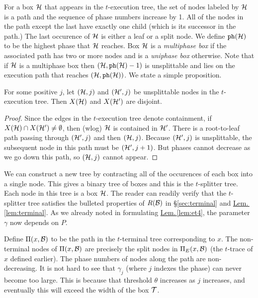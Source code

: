 \documentclass{acmsmall}
\newcommand{\cB}{{\cal B}}
\newcommand{\cH}{{\cal H}}
\newcommand{\cT}{{\cal T}}
\newcommand{\Sec}[1]{\hyperref[sec:#1]{\S\ref*{sec:#1}}} %
\newcommand{\Lem}[1]{\hyperref[lem:#1]{Lem.\,\ref*{lem:#1}}} %
\newcommand{\phase}{{\tt ph}}
\begin{document}
For a box $\cH$ that appears in the $t$-execution tree, the set of nodes labeled by $\cH$ is a path and the sequence of
phase numbers increase by 1.  All of the nodes in the path except the last have exactly one child (which is its successor
in the path.)  The last occurence of $\cH$ is either a leaf or a split node.  We define $\phase(\cH)$ to be the highest phase
that $\cH$ reaches.   Box $\cH$ is a {\em multiphase box} if the associated path has two or more nodes
and is a {\em uniphase box} otherwise.  Note that if $\cH$ is a multiphase box then $(\cH,\phase(\cH)-1)$ is
unsplittable and lies on the execution path that reaches $(\cH,\phase(\cH))$. We state a simple proposition.

\begin{proposition} \label{prop:phase-box} For some positive $j$, let $(\cH,j)$ and $(\cH',j)$ be unsplittable nodes in the $t$-execution tree.
Then $X(\cH)$ and $X(\cH')$ are disjoint.
\end{proposition}

\begin{proof} Since the edges in the $t$-execution tree denote containment, if $X(\cH) \cap X(\cH') \neq \emptyset$, then
(wlog) $\cH$ is contained in $\cH'$. There is a root-to-leaf path passing through $(\cH',j)$ and then $(\cH,j)$.
Because $(\cH',j)$ is unsplittable, the subsequent node in this path must be $(\cH',j+1)$. But phases
cannot decrease as we go down this path, so $(\cH,j)$ cannot appear.
\end{proof}

We can construct a new tree by contracting all of the occurences of each box into a single node.  This gives a binary
tree of boxes and this is the $t$-splitter tree.  Each node in this tree is a box $\cH$.
The reader can readily verify that the $t$-splitter tree satisfies the  bulleted properties of $R(\cB)$ in
\Sec{terminal} and \Lem{terminal}.  As we already noted in formulating \Lem{et4},
the parameter $\gamma$  now depends on $P$.



Define $\Pi(x,\cB)$ to be the path in the $t$-terminal tree corresponding to $x$.  The non-terminal nodes of $\Pi(x,\cB)$
are precisely the split nodes in $\Pi_E(x,\cB)$ (the $t$-trace of $x$ defined earlier).  
The phase numbers of nodes along the path are non-decreasing. 
It is not hard to see that $\gamma_j$ (where $j$ indexes the phase) can never become too large. This is because that threshold $\theta$
increases as $j$ increases, and eventually this will exceed the width of the box $\cT$. 
\end{document}
